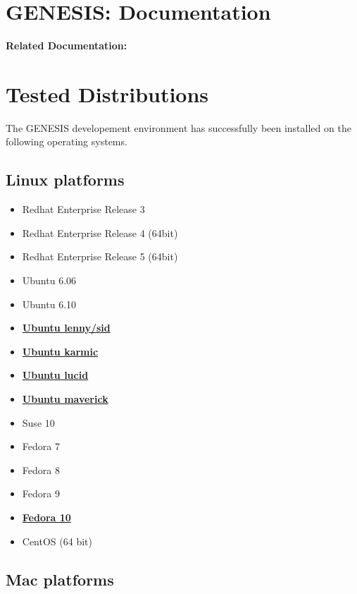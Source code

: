 \documentclass[12pt]{article}
\begin{document}
\section*{GENESIS: Documentation}

{\bf Related Documentation:}

\section*{Tested Distributions}

The GENESIS developement environment has successfully been installed on the following operating systems.

\subsection*{Linux platforms}

\begin{itemize}
\item Redhat Enterprise Release 3
\item Redhat Enterprise Release 4 (64bit)
\item Redhat Enterprise Release 5 (64bit)
\item Ubuntu 6.06
\item Ubuntu 6.10
\item \href{../installation-ubuntu-lennysid/installation-ubuntu-lennysid.tex}{\bf Ubuntu lenny/sid}
\item \href{../installation-ubuntu-karmic/installation-ubuntu-karmic.tex}{\bf Ubuntu karmic}
\item \href{../installation-ubuntu-lucid/installation-ubuntu-lucid.tex}{\bf Ubuntu lucid}
\item \href{../installation-ubuntu-maverick/installation-ubuntu-maverick.tex}{\bf Ubuntu maverick}
\item Suse 10
\item Fedora 7
\item Fedora 8
\item Fedora 9
\item \href{../installation-fedora10/installation-fedora10.tex}{\bf Fedora 10}
\item CentOS (64 bit)%
\end{itemize}

\subsection*{Mac platforms}
\end{document}
